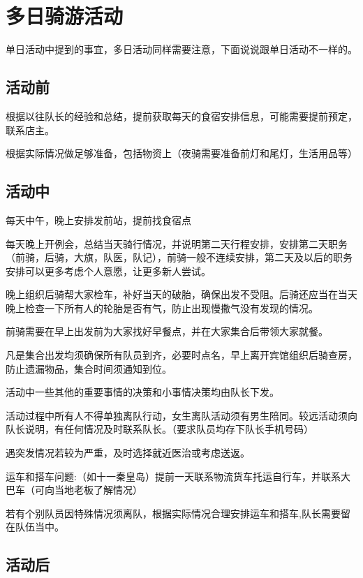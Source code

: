 \documentclass{ctexbook}
\begin{document}
\section{多日骑游活动}

单日活动中提到的事宜，多日活动同样需要注意，下面说说跟单日活动不一样的。

\subsection{活动前}

根据以往队长的经验和总结，提前获取每天的食宿安排信息，可能需要提前预定，联系店主。

根据实际情况做足够准备，包括物资上（夜骑需要准备前灯和尾灯，生活用品等）

\subsection{活动中}

每天中午，晚上安排发前站，提前找食宿点

每天晚上开例会，总结当天骑行情况，并说明第二天行程安排，安排第二天职务（前骑，后骑，大旗，队医，队记），前骑一般不连续安排，第二天及以后的职务安排可以更多考虑个人意愿，让更多新人尝试。

晚上组织后骑帮大家检车，补好当天的破胎，确保出发不受阻。后骑还应当在当天晚上检查一下所有人的轮胎是否有气，防止出现慢撒气没有发现的情况。

前骑需要在早上出发前为大家找好早餐点，并在大家集合后带领大家就餐。

凡是集合出发均须确保所有队员到齐，必要时点名，早上离开宾馆组织后骑查房，防止遗漏物品，集合时间须通知到位。

活动中一些其他的重要事情的决策和小事情决策均由队长下发。

活动过程中所有人不得单独离队行动，女生离队活动须有男生陪同。较远活动须向队长说明，有任何情况及时联系队长。（要求队员均存下队长手机号码）

遇突发情况若较为严重，及时选择就近医治或考虑送返。

运车和搭车问题:（如十一秦皇岛）提前一天联系物流货车托运自行车，并联系大巴车（可向当地老板了解情况）

若有个别队员因特殊情况须离队，根据实际情况合理安排运车和搭车,队长需要留在队伍当中。

\subsection{活动后}
\end{document}
